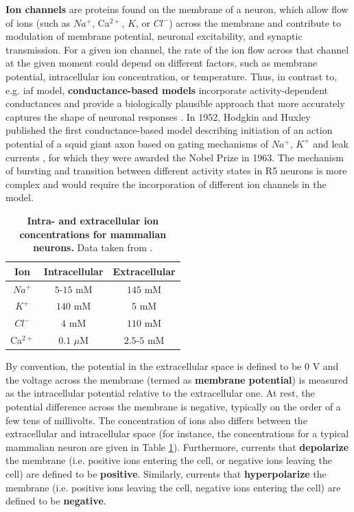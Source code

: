 \documentclass[../main.tex]{subfiles}
\begin{document}
\textbf{Ion channels} are proteins found on the membrane of a neuron, which allow flow of ions (such as $Na^+$, Ca$^{2+}$, $K$, or $Cl^-$) across the membrane and contribute to modulation of membrane potential, neuronal excitability, and synaptic transmission. For a given ion channel, the rate of the ion flow across that channel at the given moment could depend on different factors, such as membrane potential, intracellular ion concentration, or temperature. Thus, in contrast to, e.g. \gls{iaf} model, \textbf{conductance-based models} incorporate activity-dependent conductances and provide a biologically plausible approach that more accurately captures the shape of neuronal responses \parencite{destexheConductanceBasedIntegrateandFireModels1997}. In 1952, Hodgkin and Huxley published the first conductance-based model describing initiation of an action potential of a squid giant axon based on gating mechanisms of $Na^{+}$, $K^+$ and leak currents \parencite{hodgkinQuantitativeDescriptionMembrane1952}, for which they were awarded the Nobel Prize in 1963. The mechanism of bursting and transition between different activity states in R5 neurons is more complex and would require the incorporation of different ion channels in the model.

\begin{table}[!b]
    \centering
    \begin{tabular}{|c|c|c|}
        \hline
        Ion & Intracellular & Extracellular \\
        \hline
        \hline
        $Na^+$     & $5$-$15$ mM    & $145$ mM    \\
        $K^+$      & $140$ mM       & $5$ mM      \\
        $Cl^-$     & $4$ mM         & $110$ mM    \\
        Ca$^{2+}$  & $0.1$ $\mu$M   & $2.5$-$5$ mM \\
        \hline
    \end{tabular}
    \caption[Intra- and extracellular ion concentrations for mammalian neurons]{
        \textbf{Intra- and extracellular ion concentrations for mammalian neurons.}
        Data taken from \parencite{izhikevichDynamicalSystemsNeuroscience2006}.
    }
    \label{tab:typical_ion_concentrations_in_mammaly}
\end{table}

By convention, the potential in the extracellular space is defined to be $0$ V and the voltage across the membrane (termed as \textbf{membrane potential}) is measured as the intracellular potential relative to the extracellular one. At rest, the potential difference across the membrane is negative, typically on the order of a few tens of millivolts. The concentration of ions also differs between the extracellular and intracellular space (for instance, the concentrations for a typical mammalian neuron are given in Table \ref{tab:typical_ion_concentrations_in_mammaly}). Furthermore, currents that \textbf{depolarize} the membrane (i.e. positive ions entering the cell, or negative ions leaving the cell) are defined to be \textbf{positive}. Similarly, currents that \textbf{hyperpolarize} the membrane (i.e. positive ions leaving the cell, negative ions entering the cell) are defined to be \textbf{negative}.
\end{document}
